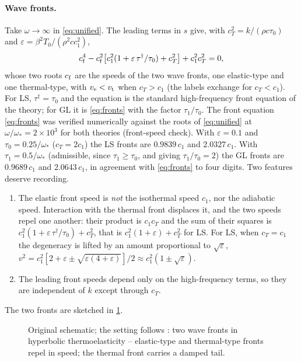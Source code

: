\paragraph{Wave fronts.} Take $\omega\to\infty$ in \eqref{eq:unified}. The leading terms in $s$ give, with $c_T^2=k/(\rho c\tau_0)$ and $\varepsilon=\beta^2T_0/(\rho^2cc_1^2)$,
\begin{equation}
c_{\rm f}^4-c_{\rm f}^2\bigl[c_1^2(1+\varepsilon\,\tau^\dagger/\tau_0)+c_T^2\bigr]+c_1^2c_T^2=0, \label{eq:fronts}
\end{equation}
whose two roots $c_{\rm f}$ are the speeds of the two wave fronts, one elastic-type and one thermal-type, with $v_{\rm e}<v_{\rm t}$ when $c_T>c_1$ (the labels exchange for $c_T<c_1$). For LS, $\tau^\dagger=\tau_0$ and the equation is the standard high-frequency front equation of the theory; for GL it is \eqref{eq:fronts} with the factor $\tau_1/\tau_0$. The front equation \eqref{eq:fronts} was verified numerically against the roots of \eqref{eq:unified} at $\omega/\omega_*=2\times10^3$ for both theories (front-speed check). With $\varepsilon=0.1$ and $\tau_0=0.25/\omega_*$ ($c_T=2c_1$) the LS fronts are $0.9839\,c_1$ and $2.0327\,c_1$. With $\tau_1=0.5/\omega_*$ (admissible, since $\tau_1\ge\tau_0$, and giving $\tau_1/\tau_0=2$) the GL fronts are $0.9689\,c_1$ and $2.0643\,c_1$, in agreement with \eqref{eq:fronts} to four digits. Two features deserve recording.
\begin{enumerate}
\item The elastic front speed is \emph{not} the isothermal speed $c_1$, nor the adiabatic speed. Interaction with the thermal front displaces it, and the two speeds repel one another: their product is $c_1c_T$ and the sum of their squares is $c_1^2(1+\varepsilon\,\tau^\dagger/\tau_0)+c_T^2$, that is $c_1^2(1+\varepsilon)+c_T^2$ for LS. For LS, when $c_T=c_1$ the degeneracy is lifted by an amount proportional to $\sqrt\varepsilon$, $v^2=c_1^2[2+\varepsilon\pm\sqrt{\varepsilon(4+\varepsilon)}]/2\approx c_1^2(1\pm\sqrt\varepsilon)$.
\item The leading front speeds depend only on the high-frequency terms, so they are independent of $k$ except through $c_T$.
\end{enumerate}

The two fronts are sketched in \cref{fig:fronts}.

\begin{figure}[t!]\centering\small

\caption{Original schematic; the setting follows \citep{Lord1967}: two wave fronts in hyperbolic thermoelasticity -- elastic-type and thermal-type fronts repel in speed; the thermal front carries a damped tail.}\label{fig:fronts}
\end{figure}

